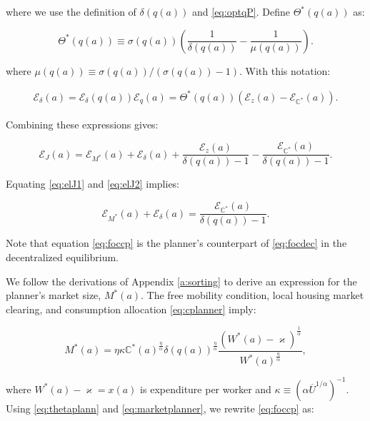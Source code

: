where we use the definition of $\delta(q(a))$ and \eqref{eq:optqP}. Define $\Theta^*(q(a))$ as:

\begin{equation}\label{eq:thetaplann}
	\Theta^*(q(a)) \equiv \sigma(q(a)) \left( \frac{1}{\delta(q(a))} - \frac{1}{\mu(q(a))} \right).
\end{equation}

where $\mu(q(a)) \equiv \sigma(q(a))/(\sigma(q(a)) - 1)$. With this notation:

\begin{align*}
	\mathcal{E}_{\delta}(a) = \mathcal{E}_{\delta}(q(a))  \mathcal{E}_{q}(a) =  \Theta^*(q(a)) \left(\mathcal{E}_z(a) - \mathcal{E}_{\mathbb{C}^*}(a) \right).
\end{align*}

Combining these expressions gives:

\begin{equation}\label{eq:elJ2}
	\mathcal{E}_J(a)  =  \mathcal{E}_{M^*}(a) + \mathcal{E}_{\delta}(a) + \frac{\mathcal{E}_z(a)}{\delta(q(a)) - 1} -  \frac{\mathcal{E}_{\mathbb{C}^*}(a)}{\delta(q(a)) - 1}.
\end{equation}

Equating \eqref{eq:elJ1} and \eqref{eq:elJ2} implies:

\begin{equation}\label{eq:foccp}
	\mathcal{E}_{M^*}(a) + \mathcal{E}_{\delta}(a) = \frac{\mathcal{E}_{\mathbb{C}^*}(a)}{\delta(q(a)) - 1}.
\end{equation}

Note that equation \eqref{eq:foccp} is the planner's counterpart of \eqref{eq:focdec} in the decentralized equilibrium.

We follow the derivations of Appendix \ref{a:sorting} to derive an expression for the planner's market size, $M^*(a)$. The free mobility condition, local housing market clearing, and consumption allocation \eqref{eq:cplanner} imply:

\begin{equation}\label{eq:marketplanner}
 	M^*(a) = \eta \kappa \mathbb{C}^*(a)^{\frac{\eta}{\alpha}} \delta(q(a))^{\frac{\eta}{\alpha}} \frac{(W^*(a) - \varkappa)^\frac{1}{\alpha}}{W^*(a)^\frac{\eta}{\alpha}}, 
\end{equation}

where $W^*(a) - \varkappa = x(a)$ is expenditure per worker and $\kappa \equiv (\alpha \overline{U}^{1/\alpha})^{-1}$. Using \eqref{eq:thetaplann} and \eqref{eq:marketplanner}, we rewrite \eqref{eq:foccp} as:

